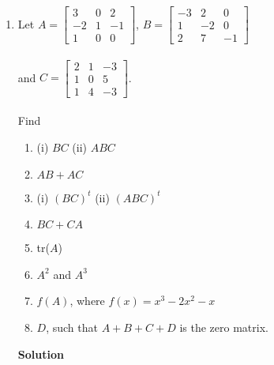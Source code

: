 
\begin{enumerate}

\item Let $A=\left [ \begin{array}{rrr} 3&0&2\\
-2&1&-1\\ 1&0&0 \end{array} \right ]$, $B=\left [
\begin{array}{rrr} -3&2&0\\ 1&-2&0\\ 2&7&-1 \end{array} \right ]$
\\ \\and $C=\left [ \begin{array}{rrr} 2&1&-3\\ 1&0&5\\ 1&4&-3
\end{array} \right ]$. \\ \\Find
\begin{enumerate}
\item (i) $BC$ \quad \quad (ii) $ABC$
\item $AB+AC$
\item (i) $(BC)^t$ \quad \quad (ii) $(ABC)^t$
\item $BC+CA$
\item tr($A$)
\item $A^2$ and $A^3$
\item $f(A)$, where $f(x)=x^3-2x^2-x$
\item $D$, such that $A+B+C+D$ is the zero matrix.
\end{enumerate}
\noindent \textbf{Solution}
\end{enumerate}
